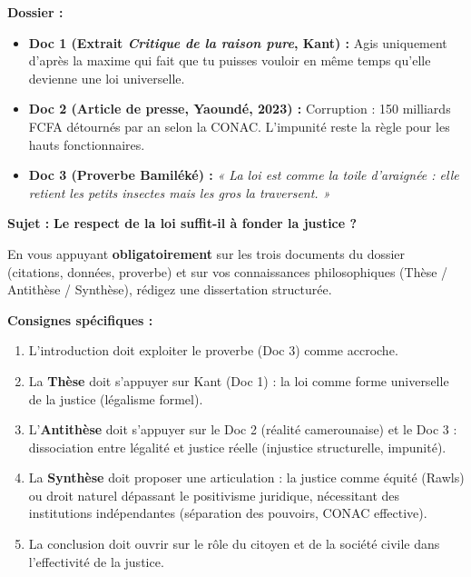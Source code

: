 \documentclass[11pt]{article}
\newcommand{\cle}[1]{{\popxbold\color{popdark}#1}}
\begin{document}
\begin{exercice}
\textbf{Dossier :}
\begin{itemize}
\item \textbf{Doc 1 (Extrait \emph{Critique de la raison pure}, Kant) :} \og Agis uniquement d'après la maxime qui fait que tu puisses vouloir en même temps qu'elle devienne une loi universelle. \fg{}
\item \textbf{Doc 2 (Article de presse, Yaoundé, 2023) :} \og Corruption : 150 milliards FCFA détournés par an selon la CONAC. L'impunité reste la règle pour les hauts fonctionnaires. \fg{}
\item \textbf{Doc 3 (Proverbe Bamiléké) :} \og \emph{« La loi est comme la toile d'araignée : elle retient les petits insectes mais les gros la traversent. »} \fg{}
\end{itemize}

\textbf{Sujet :} \og \textbf{Le respect de la loi suffit-il à fonder la justice ?} \fg{}

En vous appuyant \textbf{obligatoirement} sur les trois documents du dossier (citations, données, proverbe) et sur vos connaissances philosophiques (Thèse / Antithèse / Synthèse), rédigez une dissertation structurée.

\textbf{Consignes spécifiques :}
\begin{enumerate}
\item L'introduction doit exploiter le proverbe (Doc 3) comme \cle{accroche}.
\item La \textbf{Thèse} doit s'appuyer sur Kant (Doc 1) : la loi comme forme universelle de la justice (légalisme formel).
\item L'\textbf{Antithèse} doit s'appuyer sur le Doc 2 (réalité camerounaise) et le Doc 3 : dissociation entre légalité et justice réelle (injustice structurelle, impunité).
\item La \textbf{Synthèse} doit proposer une articulation : la justice comme \cle{équité} (Rawls) ou \cle{droit naturel} dépassant le positivisme juridique, nécessitant des institutions indépendantes (séparation des pouvoirs, CONAC effective).
\item La conclusion doit ouvrir sur le rôle du \cle{citoyen} et de la \cle{société civile} dans l'effectivité de la justice.
\end{enumerate}
\end{exercice}

\newpage
\end{document}

